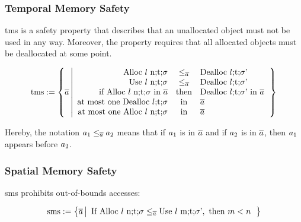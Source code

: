 \documentclass[utf8,acmsmall,review,screen,dvipsnames,anonymous]{acmart}
\begin{document}
\subsubsection{Temporal Memory Safety}

\gls{tms} is a safety property that describes that an unallocated object must not be used in any way.
Moreover, the property requires that all allocated objects must be deallocated at some point.

\begin{definition}\label{def:trace:tmsdef}
  $$
  \tmssafe:=\left\{\trace \left| \begin{array}{rcl}
                              \ev{Alloc\ \loc\ n;\sandboxtag;\securitytag}&\le_{\trace}&\ev{Dealloc\ \loc;\sandboxtag;\securitytag'} \\
                              \ev{Use\ \loc\ n;\sandboxtag;\securitytag}&\le_{\trace}&\ev{Dealloc\ \loc;\sandboxtag;\securitytag'} \\
                              \text{if }\ev{Alloc\ \loc\ n;\sandboxtag;\securitytag}\text{ in }\trace&\text{then}&\ev{Dealloc\ \loc;\sandboxtag;\securitytag'}\text{ in }\trace \\
                              \text{at most one }\ev{Dealloc\ \loc;\sandboxtag;\securitytag}&\text{in}&\trace \\
                              \text{at most one }\ev{Alloc\ \loc\ n;\sandboxtag;\securitytag}&\text{in}&\trace \\
                            \end{array}\right.\right\}
  $$
\end{definition}
Hereby, the notation $\event[_{1}]\le_{\trace}\event[_{2}]$ means that if $\event[_{1}]$ is in $\trace$ and if $\event[_{2}]$ is in $\trace$, then $\event[_{1}]$ appears before $\event[_{2}]$.

\subsubsection{Spatial Memory Safety}

\gls{sms} prohibits out-of-bounds accesses:

\begin{definition}\label{def:trace:smsdef}
  $$
  \smssafe:=\left\{\trace \left|\begin{array}{rcl}
                                  \text{If }\ev{Alloc\ \loc\ n;\sandboxtag;\securitytag}\le_{\trace}\ev{Use\ \loc\ m;\sandboxtag;\securitytag'}, \text{ then }m<n
                                \end{array}\right.\right\}
  $$
\end{definition}
\end{document}
